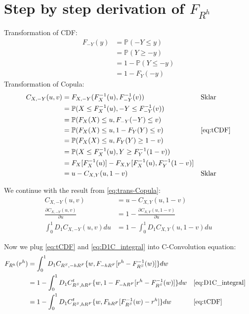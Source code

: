 \documentclass[11pt, leqno]{article}
\numberwithin{equation}{section}
\begin{document}
    \section{Step by step derivation of $F_{R^h}$}\label{sec:steps}
Transformation of CDF:
    \begin{align}
        F_{-Y}(y)
        &= \mathbb{P}(-Y \leq y) \nonumber\\
        &= \mathbb{P}(Y \geq -y) \nonumber\\
        &= 1 - \mathbb{P}(Y \leq -y)\nonumber\\
        &= 1 - F_{Y}(-y)   \label{eq:tCDF}
    \end{align}
Transformation of Copula:
    \begin{align}
        C_{X,-Y}(u,v) &=
        F_{X,-Y}(F_X^{-1}(u),F_{-Y}^{-1}(v)) &&\text{Sklar}\nonumber\\
        &=
        \mathbb{P}(X \leq F_X^{-1}(u), -Y \leq F_{-Y}^{-1}(v)) \nonumber\\
        &=
        \mathbb{P}(F_X(X) \leq u, F_{-Y}(-Y) \leq v) \nonumber\\
        &=
        \mathbb{P}(F_X(X) \leq u, 1-F_{Y}(Y) \leq v) && \text{\eqref{eq:tCDF}}\nonumber\\
        &=
        \mathbb{P}(F_X(X) \leq u, F_{Y}(Y) \geq 1-v) \nonumber\\
        &=
        \mathbb{P}(X \leq F_X^{-1}(u), Y \geq F_Y^{-1}(1-v)) \nonumber\\
        &=
        F_X[F_X^{-1}(u)] - F_{X,Y}[F_X^{-1}(u), F_Y^{-1}(1-v)] \nonumber\\
        &=
        u - C_{X,Y}(u, 1-v) &&\text{Sklar} \label{eq:trans-Copula}
    \end{align}

We continue with the result from \eqref{eq:trans-Copula}:
    \begin{align}
        C_{X,-Y}(u,v) &= u - C_{X,Y}(u, 1-v)\nonumber\\
        \frac{\partial C_{X,-Y}(u,v)}{\partial u} &= 1 - \frac{\partial C_{X,Y}(u, 1-v)}{\partial u}\\
        \int^1_0 D_1 C_{X,-Y}(u,v)du &= 1 - \int^1_0 D_1 C_{X,Y}(u,1-v)du \label{eq:D1C_integral}
    \end{align}

Now we plug \eqref{eq:tCDF} and \eqref{eq:D1C_integral} into C-Convolution equation:
    \begin{align*}
        F_{R^h}(r^h) &= \int^1_0 D_1 C_{R^S, -hR^F}
        \{w,
        F_{-hR^F}[r^h - F^{-1}_{R^S}(w)
        ]\}dw \\
        &= 1 - \int^1_0 D_1C^t_{R^S, hR^F}
        \{w,
        1- F_{-hR^F}[r^h - F^{-1}_{R^S}(w)
        ]\}dw && \text{\eqref{eq:D1C_integral}}\\
        &= 1 - \int^1_0 D_1C^t_{R^S, hR^F}
        \{w,
        F_{hR^F}[F^{-1}_{R^S}(w) - r^h
        ]\}dw && \text{\eqref{eq:tCDF}}
    \end{align*}
\end{document}
